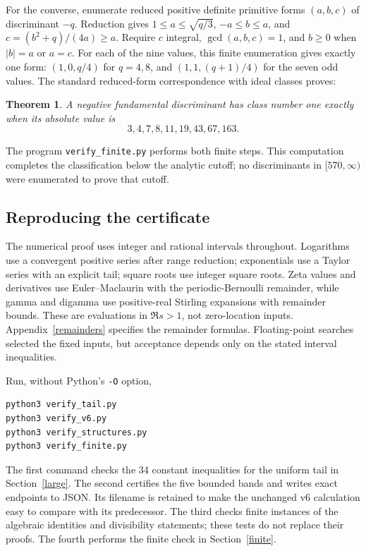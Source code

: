 \documentclass[11pt]{article}
\newtheorem{theorem}{Theorem}
\begin{document}
For the converse, enumerate reduced positive definite primitive forms
\((a,b,c)\) of discriminant \(-q\). Reduction gives
\(1\le a\le\sqrt{q/3}\), \(-a\le b\le a\), and
\(c=(b^2+q)/(4a)\ge a\). Require \(c\) integral,
\(\gcd(a,b,c)=1\), and \(b\ge0\) when \(|b|=a\) or \(a=c\).
For each of the nine values, this finite enumeration gives exactly one
form: \((1,0,q/4)\) for \(q=4,8\), and
\((1,1,(q+1)/4)\) for the seven odd values.
The standard reduced-form correspondence with ideal classes proves:
\begin{theorem}\label{classification}
A negative fundamental discriminant has class number one exactly when
its absolute value is
\[
 3,4,7,8,11,19,43,67,163.
\]
\end{theorem}
The program \texttt{verify\_finite.py} performs both finite steps.
This computation completes the classification below the analytic cutoff;
no discriminants in \([570,\infty)\) were enumerated to prove that cutoff.

\subsection{Reproducing the certificate}
The numerical proof uses integer and rational intervals throughout.
Logarithms use a convergent positive series after range reduction;
exponentials use a Taylor series with an explicit tail; square roots
use integer square roots. Zeta values and derivatives use
Euler--Maclaurin with the periodic-Bernoulli remainder, while gamma
and digamma use positive-real Stirling expansions with remainder
bounds. These are evaluations in \(\Re s>1\), not zero-location
inputs. Appendix~\ref{remainders} specifies the remainder formulas.
Floating-point searches selected the fixed inputs, but acceptance
depends only on the stated interval inequalities.

Run, without Python's \texttt{-O} option,
\begin{verbatim}
python3 verify_tail.py
python3 verify_v6.py
python3 verify_structures.py
python3 verify_finite.py
\end{verbatim}
The first command checks the 34 constant inequalities for the uniform
tail in Section~\ref{large}. The second certifies the five bounded
bands and writes exact endpoints to JSON. Its filename is retained to
make the unchanged v6 calculation easy to compare with its predecessor.
The third checks finite instances of the algebraic identities and
divisibility statements; these tests do not replace their proofs.
The fourth performs the finite check in Section~\ref{finite}.
\end{document}
